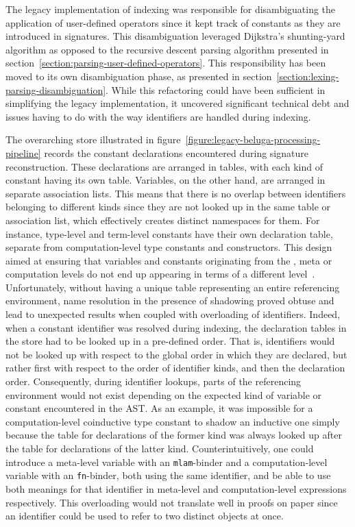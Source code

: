 

The legacy implementation of indexing was responsible for disambiguating the application of user-defined operators since it kept track of constants as they are introduced in \Beluga signatures.
This disambiguation leveraged Dijkstra's shunting-yard algorithm as opposed to the recursive descent parsing algorithm presented in section~\ref{section:parsing-user-defined-operators}.
This responsibility has been moved to its own disambiguation phase, as presented in section~\ref{section:lexing-parsing-disambiguation}.
While this refactoring could have been sufficient in simplifying the legacy implementation, it uncovered significant technical debt and issues having to do with the way identifiers are handled during indexing.

The overarching store illustrated in figure~\ref{figure:legacy-beluga-processing-pipeline} records the constant declarations encountered during signature reconstruction.
These declarations are arranged in tables, with each kind of constant having its own table.
Variables, on the other hand, are arranged in separate association lists.
This means that there is no overlap between identifiers belonging to different kinds since they are not looked up in the same table or association list, which effectively creates distinct namespaces for them.
For instance, \LF type-level and term-level constants have their own declaration table, separate from computation-level type constants and constructors.
This design aimed at ensuring that variables and constants originating from the \LF, meta or computation levels do not end up appearing in terms of a different level~\cite{germain2010implementation}.
Unfortunately, without having a unique table representing an entire referencing environment, name resolution in the presence of shadowing proved obtuse and lead to unexpected results when coupled with overloading of identifiers.
Indeed, when a constant identifier was resolved during indexing, the declaration tables in the store had to be looked up in a pre-defined order.
That is, identifiers would not be looked up with respect to the global order in which they are declared, but rather first with respect to the order of identifier kinds, and then the declaration order.
Consequently, during identifier lookups, parts of the referencing environment would not exist depending on the expected kind of variable or constant encountered in the \ac{AST}.
As an example, it was impossible for a computation-level coinductive type constant to shadow an inductive one simply because the table for declarations of the former kind was always looked up after the table for declarations of the latter kind.
Counterintuitively, one could introduce a meta-level variable with an \verb|mlam|-binder and a computation-level variable with an \verb|fn|-binder, both using the same identifier, and be able to use both meanings for that identifier in meta-level and computation-level expressions respectively.
This overloading would not translate well in proofs on paper since an identifier could be used to refer to two distinct objects at once.

